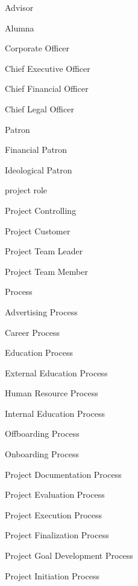 \documentclass[a4paper, DIV=13, BCOR=0cm]{scrbook}
\begin{document}
\begin{multicols}{2}
\begin{compactitem}
\begin{compactitem}
			\begin{compactitem}
				\item Advisor
				\item Alumna
				\item Corporate Officer
				\begin{compactitem}
					\item Chief Executive Officer
					\item Chief Financial Officer
					\item Chief Legal Officer
				\end{compactitem}
				\item Patron
				\begin{compactitem}
					\item Financial Patron
					\item Ideological Patron
				\end{compactitem}
			\end{compactitem}
			\item project role
			\begin{compactitem}
				\item Project Controlling
				\item Project Customer
				\item Project Team Leader
				\item Project Team Member
			\end{compactitem}
		\end{compactitem}
		\columnbreak
		\item Process
		\begin{compactitem}
			\item Advertising Process
			\item Career Process
			\item Education Process
			\item External Education Process
			\item Human Resource Process
			\item Internal Education Process
			\item Offboarding Process
			\item Onboarding Process
			\item Project Documentation Process
			\item Project Evaluation Process
			\item Project Execution Process
			\item Project Finalization Process
			\item Project Goal Development Process
			\item Project Initiation Process

\end{compactitem}
\end{compactitem}
\end{multicols}
\end{document}
